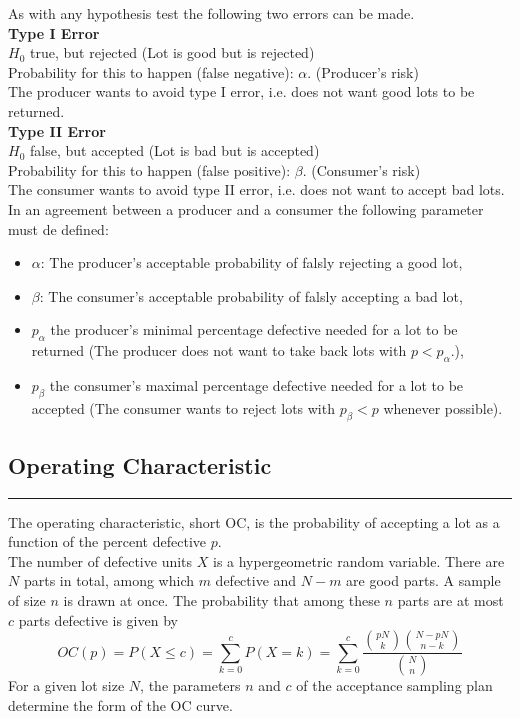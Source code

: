 As with any hypothesis test the following two errors can be made.\\

\textbf{Type I Error}\\
$H_0$ true, but rejected (Lot is good but is rejected)\\
Probability for this to happen (false negative): $\alpha$. (Producer's risk)\\
The producer wants to avoid type I error, i.e. does not want good lots to be returned.\\

\textbf{Type II Error}\\
$H_0$ false, but accepted (Lot is bad but is accepted)\\
Probability for this to happen (false positive): $\beta$. (Consumer's risk)\\
The consumer wants to avoid type II error, i.e. does not want to accept bad lots.\\


In an agreement between a producer and a consumer the following parameter must de defined:
\begin{itemize}
  \item $\alpha$: The producer's acceptable probability of falsly rejecting a good lot,
  \item $\beta$: The consumer's acceptable probability of falsly accepting a bad lot,
  \item $p_{\alpha}$ the producer's minimal percentage defective needed for a lot to be returned (The producer does not want to take back lots with $p < p_{\alpha}$.),
  \item $p_{\beta}$ the consumer's maximal percentage defective needed for a lot to be accepted (The consumer wants to reject lots with $p_{\beta} < p$ whenever possible).
\end{itemize}

\subsection{Operating Characteristic}
\noindent\rule[\linienAbstand]{\linewidth}{\linienDicke}
The operating characteristic, short OC, is the probability of accepting a lot as a function of the percent defective $p$.\\
The number of defective units $X$ is a hypergeometric random variable. There are $N$ parts in total, among which $m$ defective and $N - m$ are good parts. A sample of size $n$ is drawn at once. The probability that among these $n$ parts are at most $c$ parts defective is given by
\begin{equation}
  OC(p) = P(X \leq c)= \sum^c_{k=0} P(X = k) = \sum^c_{k=0} \frac{\binom{pN}{k}\binom{N-pN}{n-k}}{\binom{N}{n}}
  \label{eq:OC}
\end{equation}
For a given lot size $N$, the parameters $n$ and $c$ of the acceptance sampling plan determine the form of the OC curve.\\

